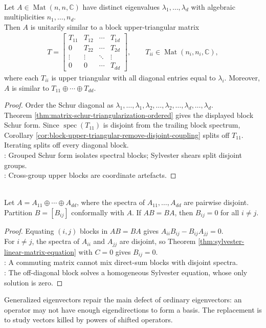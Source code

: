 \begin{theorem} \label{thm:schur-block-form-by-eigenvalue-groups} \\
Let $A\in\operatorname{Mat}(n,n,\mathbb{C})$ have distinct eigenvalues $\lambda_1,\ldots,\lambda_d$ with algebraic multiplicities $n_1,\ldots,n_d$.\\
Then $A$ is unitarily similar to a block upper-triangular matrix
\begin{align}
T=
\begin{bmatrix}
T_{11}&T_{12}&\cdots&T_{1d}\\
0&T_{22}&\cdots&T_{2d}\\
\vdots&\vdots&\ddots&\vdots\\
0&0&\cdots&T_{dd}
\end{bmatrix},
\qquad
T_{ii}\in\operatorname{Mat}(n_i,n_i,\mathbb{C}),
\nonumber
\end{align}
where each $T_{ii}$ is upper triangular with all diagonal entries equal to $\lambda_i$. Moreover, $A$ is similar to $T_{11}\oplus\cdots\oplus T_{dd}$.
\begin{proof}
Order the Schur diagonal as $\lambda_1,\ldots,\lambda_1,\lambda_2,\ldots,\lambda_2,\ldots,\lambda_d,\ldots,\lambda_d$.\\
Theorem \ref{thm:matrix-schur-triangularization-ordered} gives the displayed block Schur form. Since $\operatorname{spec}(T_{11})$ is disjoint from the trailing block spectrum, Corollary \ref{cor:block-upper-triangular-remove-disjoint-coupling} splits off $T_{11}$. Iterating splits off every diagonal block.\\
: Grouped Schur form isolates spectral blocks; Sylvester shears split disjoint groups.\\
: Cross-group upper blocks are coordinate artefacts.
\end{proof}
\end{theorem}

\begin{corollary} \label{cor:commuting-with-disjoint-blocks-has-zero-off-diagonal-blocks} \\
Let $A=A_{11}\oplus\cdots\oplus A_{dd}$, where the spectra of $A_{11},\ldots,A_{dd}$ are pairwise disjoint.\\
Partition $B=[B_{ij}]$ conformally with $A$. If $AB=BA$, then $B_{ij}=0$ for all $i\neq j$.
\begin{proof}
Equating $(i,j)$ blocks in $AB=BA$ gives $A_{ii}B_{ij}-B_{ij}A_{jj}=0$.\\
For $i\neq j$, the spectra of $A_{ii}$ and $A_{jj}$ are disjoint, so Theorem \ref{thm:sylvester-linear-matrix-equation} with $C=0$ gives $B_{ij}=0$.\\
: A commuting matrix cannot mix direct-sum blocks with disjoint spectra.\\
: The off-diagonal block solves a homogeneous Sylvester equation, whose only solution is zero.
\end{proof}
\end{corollary}

Generalized eigenvectors repair the main defect of ordinary eigenvectors: an operator may not have enough eigendirections to form a basis. The replacement is to study vectors killed by powers of shifted operators.


